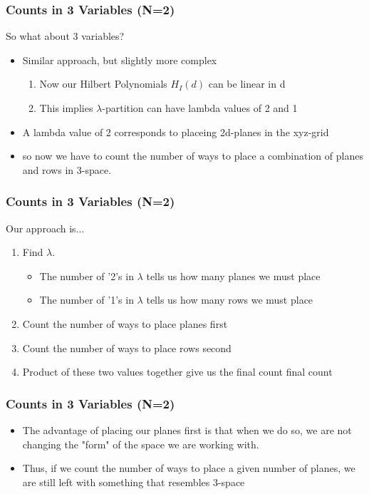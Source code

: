 \documentclass{beamer}
\begin{document}
\begin{frame}
	\frametitle{Counts in 3 Variables (N=2)}
	So what about 3 variables?
	\begin{itemize}
	\item Similar approach, but slightly more complex
	\begin{enumerate}
	\item Now our Hilbert Polynomials $H_I(d)$ can be linear in d
	\item This implies $\lambda$-partition can have lambda values of 2 and 1
	\end{enumerate}
	\item A lambda value of 2 corresponds to placeing 2d-planes in the xyz-grid
	\item so now we have to count the number of ways to place a combination of planes and rows in 3-space.
	\end{itemize}
\end{frame}

\begin{frame}
	\frametitle{Counts in 3 Variables (N=2)}
	Our approach is...
	\begin{enumerate}
	\item Find $\lambda$. 
	\begin{itemize}
		\item The number of '2's in $\lambda$ tells us how many planes we must place
		\item The number of '1's in $\lambda$ tells us how many rows we must place
	\end{itemize}
	\item Count the number of ways to place planes first
	\item Count the number of ways to place rows second
	\item Product of these two values together give us the final count final count
	\end{enumerate}
\end{frame}

\begin{frame}
	\frametitle{Counts in 3 Variables (N=2)}
	\begin{itemize}
	\item The advantage of placing our planes first is that when we do so, we are not changing the "form" of the space we are working with.
	\item Thus, if we count the number of ways to place a given number of planes, we are still left with something that resembles 3-space
	\end{itemize}
\end{frame}
\end{document}
